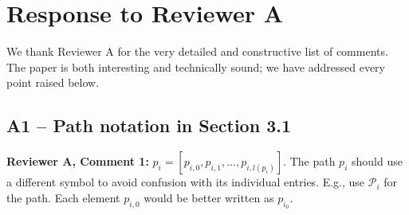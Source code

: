 \documentclass[review]{jair}
\begin{document}
\section*{Response to Reviewer A}

\noindent We thank Reviewer A for the very detailed and constructive list of comments. The paper is both interesting and technically sound; we have addressed every point raised below.

\subsection*{A1 -- Path notation in Section 3.1}

\begin{reviewerbox}
\textbf{Reviewer A, Comment 1:} $p_i = [p_{i,0}, p_{i,1}, \ldots, p_{i,l(p_i)}]$. The path $p_i$ should use a different symbol to avoid confusion with its individual entries. E.g., use $\mathcal{P}_i$ for the path. Each element $p_{i,0}$ would be better written as $p_{i_0}$.
\end{reviewerbox}
\end{document}
